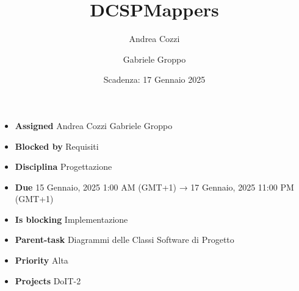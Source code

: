 \title{DCSPMappers}
\author{Andrea Cozzi \and Gabriele Groppo}
\date{Scadenza: 17 Gennaio 2025}

\maketitle

\begin{itemize}
    \item \textbf{Assigned} Andrea Cozzi Gabriele Groppo
    \item \textbf{Blocked by} Requisiti
    \item \textbf{Disciplina} Progettazione
    \item \textbf{Due} 15 Gennaio, 2025 1:00 AM (GMT+1) → 17 Gennaio, 2025 11:00 PM (GMT+1)
    \item \textbf{Is blocking} Implementazione
    \item \textbf{Parent-task} Diagrammi delle Classi Software di Progetto
    \item \textbf{Priority} Alta
    \item \textbf{Projects} DoIT-2
\end{itemize}